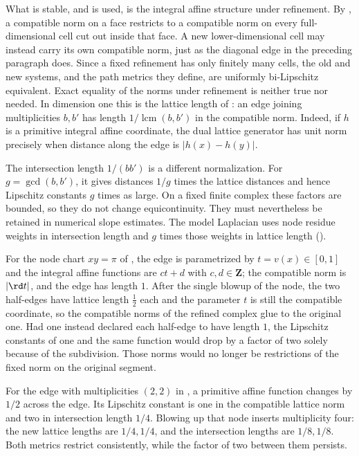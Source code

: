 What is stable, and is used, is the integral affine structure under
refinement.  By , a compatible norm on
a face restricts to a compatible norm on every full-dimensional cell cut
out inside that face.  A new lower-dimensional cell may instead carry its
own compatible norm, just as the diagonal edge in the preceding paragraph
does.  Since a fixed refinement has only finitely many cells, the old and
new systems, and the path metrics they define, are uniformly bi-Lipschitz
equivalent.  Exact equality of the norms under refinement is neither true
nor needed.
In dimension one this is the lattice length of
: an edge joining multiplicities $b,b'$
has length $1/\operatorname{lcm}(b,b')$ in the compatible norm.
Indeed, if $h$ is a primitive integral affine coordinate, the
dual lattice generator has unit norm precisely when distance
along the edge is $|h(x)-h(y)|$.

The intersection length $1/(bb')$ is a different normalization.
For $g=\gcd(b,b')$, it gives distances $1/g$ times the lattice
distances and hence Lipschitz constants $g$ times as large.
On a fixed finite complex these factors are bounded, so they do
not change equicontinuity.  They must nevertheless be retained
in numerical slope estimates.  The model Laplacian uses node
residue weights in intersection length and $g$ times those
weights in lattice length
().

\begin{example}
\label{ex:ch22-edge-normalization}
For the node chart $xy=\pi$ of , the edge is
parametrized by $t=v(x)\in[0,1]$ and the integral affine functions are
$ct+d$ with $c,d\in\mathbf Z$; the compatible norm is $|\rd t|$, and the
edge has length $1$.  After the single blowup of the node, the two
half-edges have lattice length $\tfrac12$ each and the parameter $t$ is
still the compatible coordinate, so the compatible norms of the refined
complex glue to the original one.  Had one instead declared each half-edge
to have length $1$, the Lipschitz constants of one and the same function
would drop by a factor of two solely because of the subdivision.
Those norms would no longer be restrictions of the fixed norm
on the original segment.

For the edge with multiplicities $(2,2)$ in
, a primitive affine function changes by
$1/2$ across the edge.  Its Lipschitz constant is one in the
compatible lattice norm and two in intersection length $1/4$.
Blowing up that node inserts multiplicity four: the new lattice
lengths are $1/4,1/4$, and the intersection lengths are $1/8,1/8$.
Both metrics restrict consistently, while the factor of two
between them persists.
\end{example}

